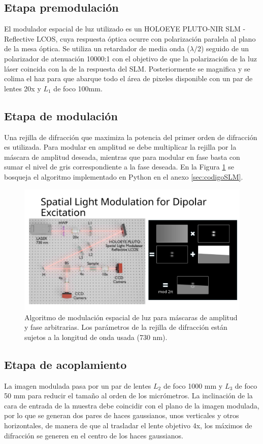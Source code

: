 \subsection{Etapa premodulación}
	El modulador espacial de luz utilizado es un HOLOEYE PLUTO-NIR SLM -  Reflective LCOS, cuya respuesta óptica ocurre con polarización paralela al plano de la mesa óptica. Se utiliza un retardador de media onda ($\lambda/2$) seguido de un polarizador de atenuación 10000:1 con el objetivo de que la polarización de la luz láser coincida con la de la respuesta del SLM. Posteriormente se magnifica y se colima el haz para que abarque todo el área de pixeles disponible con un par de lentes 20x y $L_1$ de foco 100mm. 
\subsection{Etapa de modulación}
	Una rejilla de difracción que maximiza la potencia del primer orden de difracción es utilizada. Para modular en amplitud se debe multiplicar la rejilla por la máscara de amplitud deseada, mientras que para modular en fase basta con sumar el nivel de gris correspondiente a la fase deseada. En la Figura \ref{fig:SLMblaze} se bosqueja el algoritmo implementado en Python en el anexo \ref{sec:codigoSLM}.
	
{
\begin{figure}
	\centering
	\includegraphics[width=0.35\linewidth, trim={19.5cm 0 0 5cm},clip]{media/SLMblaze4.png}
	\caption{Algoritmo de modulación espacial de luz para máscaras de amplitud y fase arbitrarias. Los parámetros de la rejilla de difracción están sujetos a la longitud de onda usada (730 nm).     \label{fig:SLMblaze}}
	\end{figure}
	}
\subsection{Etapa de acoplamiento}
La imagen modulada pasa por un par de lentes $L_2$ de foco 1000 mm y $L_3$ de foco 50 mm para reducir el tamaño al orden de los micrómetros. La inclinación de la cara de entrada de la muestra debe coincidir con el plano de la imagen modulada, por lo que se generan dos pares de haces gaussianos, unos verticales y otros horizontales, de manera de que al trasladar el lente objetivo 4x, los máximos de difracción se generen en el centro de los haces gaussianos. 
